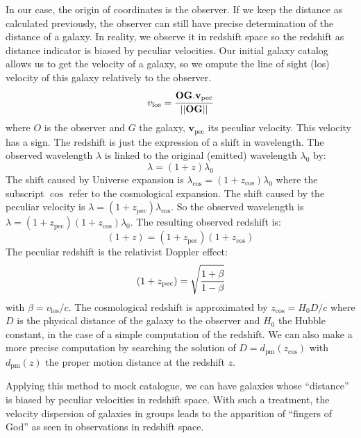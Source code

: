 In our case, the origin of coordinates is the observer. If we keep the distance
as calculated previously, the observer can still have precise determination of
the distance of a galaxy. In reality, we observe it in redshift space so the
redshift as distance indicator is biased by peculiar velocities. Our initial
galaxy catalog allows us to get the velocity of a galaxy, so we ompute the line
of sight (los) velocity of this galaxy relatively to the observer.
%
\begin{equation}
v_\mathrm{los}=\cfrac{\textbf{OG}.\textbf{v}_\mathrm{pec}}
    {\left|\left|\textbf{OG}\right|\right|}
\end{equation}
%
where $O$ is the observer and $G$ the galaxy, $\textbf{v}_{\mathrm{pec}}$ its
peculiar velocity. This velocity has a sign. The redshift is just the
expression of a shift in wavelength. The observed wavelength $\lambda$ is
linked to the original (emitted) wavelength $\lambda_0$ by:
%
\begin{equation}
    \lambda=(1+z)\lambda_0
\end{equation}
%
The shift caused by Universe expansion is
$\lambda_{\cos}=(1+z_{\cos})\lambda_0$ where the subscript $\cos$ refer to the
cosmological expansion. The shift caused by the peculiar velocity is
$\lambda=(1+z_{\mathrm{pec}})\lambda_{\cos}$. So the observed wavelength is
$\lambda=(1+z_{\mathrm{pec}})(1+z_{\cos})\lambda_0$. The resulting observed
redshift is:
%
\begin{equation}
    (1+z)=(1+z_{\mathrm{pec}})(1+z_{\cos})
\end{equation}
%
The peculiar redshift is the relativist Doppler effect:
%
\begin{equation}
    (1+z_{\mathrm{pec}})=\sqrt{\cfrac{1+\beta}{1-\beta}}
\end{equation}
%
with $\beta={v_{\mathrm{los}}}/{c}$. The cosmological redshift is approximated
by $z_{\cos}={H_0}{D}/c$ where $D$ is the physical distance of the galaxy to
the observer and $H_0$ the Hubble constant, in the case of a simple computation
of the redshift. We can also make a more precise computation by searching the
solution of $D=d_\mathrm{pm} \left(z_{\cos}\right)$ with $d_\mathrm{pm}
\left(z\right)$ the proper motion distance at the redshift $z$.

Applying this method to mock catalogue, we can have galaxies whose ``distance''
is biased by peculiar velocities in redshift space. With such a treatment, the
velocity dispersion of galaxies in groups leads to the apparition of ``fingers
of God'' as seen in observations in redshift space.

